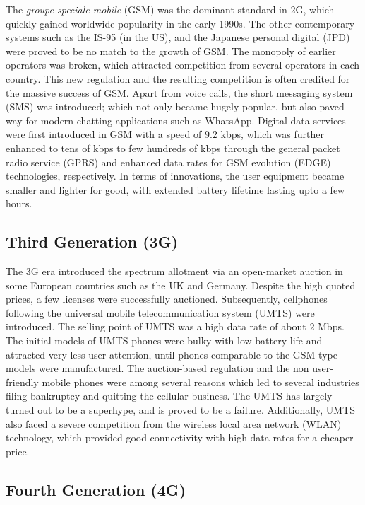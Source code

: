 \begin{multicols}{2}
The \emph{groupe speciale mobile} (GSM) was the dominant standard in 2G, which quickly gained worldwide popularity in the early 1990s. The other contemporary systems such as the IS-95 (in the US), and the Japanese personal digital (JPD) were proved to be no match to the growth of GSM. The monopoly of earlier operators was broken, which attracted competition from several operators in each country. This new regulation and the resulting competition is often credited for the massive success of GSM. Apart from voice calls, the short messaging system (SMS) was introduced; which not only became hugely popular, but also paved way for modern chatting applications such as WhatsApp. Digital data services were first introduced in GSM with a speed of $9.2$ kbps, which was further enhanced to tens of kbps to few hundreds of kbps through the general packet radio service (GPRS) and enhanced data rates for GSM evolution (EDGE) technologies, respectively. In terms of innovations, the user equipment became smaller and lighter for good, with extended battery lifetime lasting upto a few hours.

\subsection{Third Generation (3G)} \label{SubSec_3G}

The 3G era introduced the spectrum allotment via an open-market auction in some European countries such as the UK and Germany. Despite the high quoted prices, a few licenses were successfully auctioned. Subsequently, cellphones following the universal mobile telecommunication system (UMTS) were introduced. The selling point of UMTS was a high data rate of about $2$ Mbps. The initial models of UMTS phones were bulky with low battery life and attracted very less user attention, until phones comparable to the GSM-type models were manufactured. The auction-based regulation and the non user-friendly mobile phones were among several reasons which led to several industries filing bankruptcy and quitting the cellular business. The UMTS has largely turned out to be a superhype, and is proved to be a failure. Additionally, UMTS also faced a severe competition from the wireless local area network (WLAN) technology, which provided good connectivity with high data rates for a cheaper price.

\subsection{Fourth Generation (4G)} \label{SubSec_4G}


\end{multicols}
